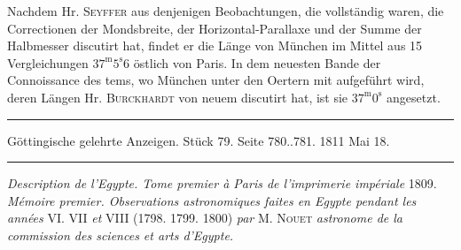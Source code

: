 Nachdem Hr. \textsc{Seyffer} aus denjenigen Beobachtungen, die vollständig waren, die Correctionen der Mondsbreite, der Horizontal-Parallaxe und der Summe der Halbmesser discutirt hat, findet er die Länge von München im Mittel aus 15 Vergleichungen $37^{\mathrm m}5^{\mathrm s}6$ östlich von Paris. In dem neuesten Bande der Connoissance des tems, wo München unter den Oertern mit aufgeführt wird, deren Längen Hr. \textsc{Burckhardt} von neuem discutirt hat, ist sie $37^{\mathrm m}0^{\mathrm s}$ angesetzt.

\par\bigskip
\hypertarget{native-539Nouet}{}\label{native-539Nouet}
\begin{center}
\parbox{.92\linewidth}{\centering\small
\rule{\linewidth}{.3pt}\par\smallskip
Göttingische gelehrte Anzeigen. Stück 79. Seite 780..781. 1811 Mai 18.\par\smallskip
\rule{\linewidth}{.3pt}}
\end{center}
\par\medskip

\emph{Description de l'Egypte. Tome premier à Paris de l'imprimerie impériale} 1809. \raisebox{-0.3ex}{,}\emph{Mémoire premier. Observations astronomiques faites en Egypte pendant les années} VI. VII \emph{et} VIII (1798. 1799. 1800) \emph{par} M. \textsc{Nouet} \emph{astronome de la commission des sciences et arts d'Egypte.}

